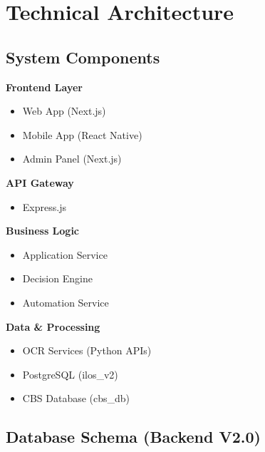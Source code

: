 \documentclass[12pt,a4paper]{article}
\begin{document}
\newpage

\section{Technical Architecture}

\subsection{System Components}

\begin{tcolorbox}[colback=codecolor,colframe=tealcolor,title=System Architecture]
\textbf{Frontend Layer}
\begin{itemize}[noitemsep]
    \item Web App (Next.js)
    \item Mobile App (React Native)
    \item Admin Panel (Next.js)
\end{itemize}

\textbf{API Gateway}
\begin{itemize}[noitemsep]
    \item Express.js
\end{itemize}

\textbf{Business Logic}
\begin{itemize}[noitemsep]
    \item Application Service
    \item Decision Engine
    \item Automation Service
\end{itemize}

\textbf{Data \& Processing}
\begin{itemize}[noitemsep]
    \item OCR Services (Python APIs)
    \item PostgreSQL (ilos\_v2)
    \item CBS Database (cbs\_db)
\end{itemize}
\end{tcolorbox}

\subsection{Database Schema (Backend V2.0)}
\end{document}
